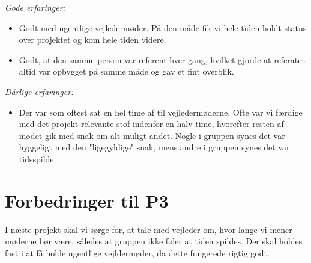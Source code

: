 \emph{Gode erfaringer:}
\begin{itemize}

\item Godt med ugentlige vejledermøder. På den måde fik vi hele tiden holdt status over projektet og kom hele tiden videre.

\item Godt, at den samme person var referent hver gang, hvilket gjorde at referatet altid var opbygget på samme måde og gav et fint overblik.
\end{itemize}
\emph{Dårlige erfaringer:}
\begin{itemize}
\item	Der var som oftest sat en hel time af til vejledermøderne. Ofte var vi færdige med det projekt-relevante stof indenfor en halv time, hvorefter resten af mødet gik med snak om alt muligt andet. Nogle i gruppen synes det var hyggeligt med den "ligegyldige" snak, mens andre i gruppen synes det var tidsspilde.

\end{itemize}

\section{Forbedringer til P3}

I næste projekt skal vi sørge for, at tale med vejleder om, hvor lange vi mener møderne bør være, således at gruppen ikke føler at tiden spildes. Der skal holdes fast i at få holde ugentlige vejldermøder, da dette fungerede rigtig godt. 
